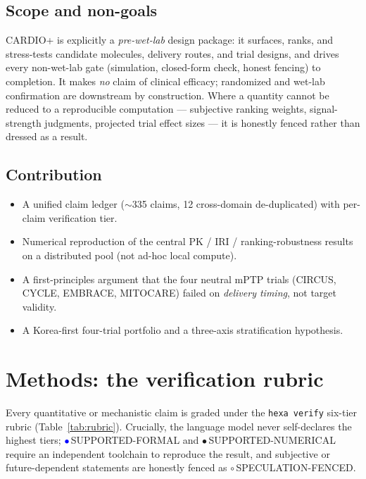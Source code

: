 \documentclass[11pt]{article}
\begin{document}
\subsection{Scope and non-goals}
CARDIO+ is explicitly a \emph{pre-wet-lab} design package: it surfaces, ranks, and stress-tests candidate molecules, delivery routes, and trial designs, and drives every non-wet-lab gate (simulation, closed-form check, honest fencing) to completion. It makes \emph{no} claim of clinical efficacy; randomized and wet-lab confirmation are downstream by construction. Where a quantity cannot be reduced to a reproducible computation --- subjective ranking weights, signal-strength judgments, projected trial effect sizes --- it is honestly fenced rather than dressed as a result.

\subsection{Contribution}
\begin{itemize}
  \item A unified claim ledger ($\sim$335 claims, 12 cross-domain de-duplicated) with per-claim verification tier.
  \item Numerical reproduction of the central PK / IRI / ranking-robustness results on a distributed pool (not ad-hoc local compute).
  \item A first-principles argument that the four neutral mPTP trials (CIRCUS, CYCLE, EMBRACE, MITOCARE) failed on \emph{delivery timing}, not target validity.
  \item A Korea-first four-trial portfolio and a three-axis stratification hypothesis.
\end{itemize}

\section{Methods: the verification rubric}
\label{sec:methods}

Every quantitative or mechanistic claim is graded under the \texttt{hexa verify} six-tier rubric (Table~\ref{tab:rubric}). Crucially, the language model never self-declares the highest tiers; \textcolor{blue}{$\bullet$}\,SUPPORTED-FORMAL and \textcolor{green!60!black}{$\bullet$}\,SUPPORTED-NUMERICAL require an independent toolchain to reproduce the result, and subjective or future-dependent statements are honestly fenced as $\circ$\,SPECULATION-FENCED.
\end{document}
